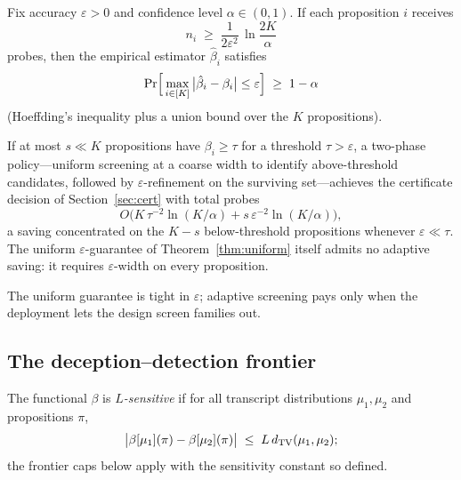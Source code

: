 \begin{theorem}\label{thm:uniform}
Fix accuracy $\varepsilon>0$ and confidence level $\alpha\in(0,1)$. If each
proposition $i$ receives
\[
n_i \;\ge\; \frac{1}{2\varepsilon^{2}}\,\ln\frac{2K}{\alpha}
\]
probes, then the empirical estimator $\hat\beta_i$ satisfies
\[
\Pr\Bigl[\,\max_{i\in[K]}\,\bigl|\hat\beta_i-\beta_i\bigr|\le\varepsilon
\Bigr]\;\ge\;1-\alpha
\]
(Hoeffding's inequality \cite{hoeffding1963} plus a union bound over the $K$
propositions).
\end{theorem}

\begin{proposition}\label{prop:screening}
If at most $s\ll K$ propositions have $\beta_i\ge\tau$ for a threshold
$\tau>\varepsilon$, a two-phase policy---uniform screening at a coarse
width to identify above-threshold candidates, followed by
$\varepsilon$-refinement on the surviving set---achieves the certificate
decision of Section~\ref{sec:cert} with total probes
\[
O\bigl(K\,\tau^{-2}\ln(K/\alpha)+s\,\varepsilon^{-2}\ln(K/\alpha)\bigr),
\]
a saving concentrated on the $K-s$ below-threshold propositions whenever
$\varepsilon\ll\tau$. The uniform $\varepsilon$-guarantee of
Theorem~\ref{thm:uniform} itself admits no adaptive saving: it requires
$\varepsilon$-width on every proposition.
\end{proposition}

The uniform guarantee is tight in $\varepsilon$; adaptive screening pays only
when the deployment lets the design screen families out.

\subsection{The deception--detection frontier}\label{sec:t5}

\begin{definition}[Sensitivity]\label{def:sens}
The functional $\beta$ is \emph{$L$-sensitive} if for all transcript
distributions $\mu_1,\mu_2$ and propositions $\pi$,
\[
\bigl|\beta[\mu_1](\pi)-\beta[\mu_2](\pi)\bigr|
\;\le\;L\,d_{\mathrm{TV}}(\mu_1,\mu_2);
\]
the frontier caps below apply with the sensitivity constant so defined.
\end{definition}

